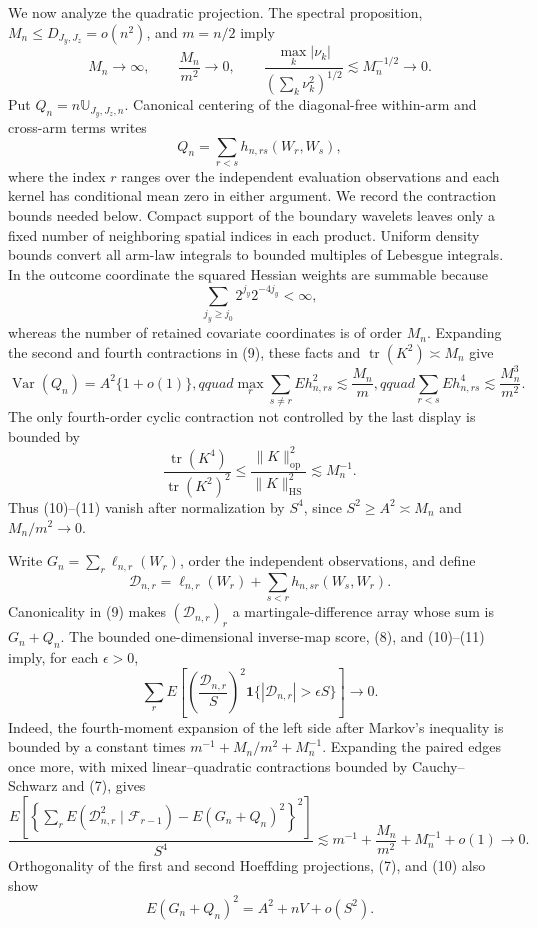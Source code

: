 We now analyze the quadratic projection.  The spectral proposition, \(M_n\le D_{J_y,J_z}=o(n^2)\), and \(m=n/2\) imply
\[
M_n\to\infty,\qquad \frac{M_n}{m^2}\to0,
\qquad
\frac{\max_k|\nu_k|}{(\sum_k\nu_k^2)^{1/2}}\lesssim M_n^{-1/2}\to0. \tag{8}
\]
Put \(Q_n=n\mathbb U_{J_y,J_z,n}\).  Canonical centering of the diagonal-free within-arm and cross-arm terms writes
\[
Q_n=\sum_{r<s}h_{n,rs}(W_r,W_s), \tag{9}
\]
where the index \(r\) ranges over the independent evaluation observations and each kernel has conditional mean zero in either argument.  We record the contraction bounds needed below.  Compact support of the boundary wavelets leaves only a fixed number of neighboring spatial indices in each product.  Uniform density bounds convert all arm-law integrals to bounded multiples of Lebesgue integrals.  In the outcome coordinate the squared Hessian weights are summable because
\[
\sum_{j_y\ge j_0}2^{j_y}2^{-4j_y}<\infty,
\]
whereas the number of retained covariate coordinates is of order \(M_n\).  Expanding the second and fourth contractions in (9), these facts and \(\operatorname{tr}(K^2)\asymp M_n\) give
\[
\operatorname{Var}(Q_n)=A^2\{1+o(1)\},qquad
\max_r\sum_{s\ne r}E h_{n,rs}^2\lesssim \frac{M_n}{m},qquad
\sum_{r<s}E h_{n,rs}^4\lesssim\frac{M_n^3}{m^2}. \tag{10}
\]
The only fourth-order cyclic contraction not controlled by the last display is bounded by
\[
\frac{\operatorname{tr}(K^4)}{\operatorname{tr}(K^2)^2}
\le\frac{\|K\|_{\mathrm{op}}^2}{\|K\|_{\mathrm{HS}}^2}\lesssim M_n^{-1}. \tag{11}
\]
Thus (10)--(11) vanish after normalization by \(S^4\), since \(S^2\ge A^2\asymp M_n\) and \(M_n/m^2\to0\).

Write \(G_n=\sum_r\ell_{n,r}(W_r)\), order the independent observations, and define
\[
\mathcal D_{n,r}=\ell_{n,r}(W_r)+\sum_{s<r}h_{n,sr}(W_s,W_r).
\]
Canonicality in (9) makes \((\mathcal D_{n,r})_r\) a martingale-difference array whose sum is \(G_n+Q_n\).  The bounded one-dimensional inverse-map score, (8), and (10)--(11) imply, for each \(\epsilon>0\),
\[
\sum_rE\left[\left(\frac{\mathcal D_{n,r}}S\right)^2
\mathbf1\{|\mathcal D_{n,r}|>\epsilon S\}\right]\longrightarrow0. \tag{12}
\]
Indeed, the fourth-moment expansion of the left side after Markov's inequality is bounded by a constant times \(m^{-1}+M_n/m^2+M_n^{-1}\).  Expanding the paired edges once more, with mixed linear--quadratic contractions bounded by Cauchy--Schwarz and (7), gives
\[
\frac{E\left[\left\{\sum_rE(\mathcal D_{n,r}^2\mid\mathcal F_{r-1})
-E(G_n+Q_n)^2\right\}^2\right]}{S^4}
\lesssim m^{-1}+\frac{M_n}{m^2}+M_n^{-1}+o(1)\longrightarrow0. \tag{13}
\]
Orthogonality of the first and second Hoeffding projections, (7), and (10) also show
\[
E(G_n+Q_n)^2=A^2+nV+o(S^2). \tag{14}
\]

